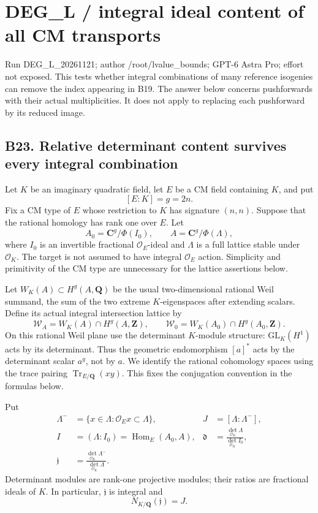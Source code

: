 \documentclass[11pt,a4paper]{article}
\providecommand{\tightlist}{\setlength{\itemsep}{0pt}\setlength{\parskip}{0pt}}
\theoremstyle{definition}
\begin{document}
\providecommand{\tightlist}{\setlength{\itemsep}{0pt}\setlength{\parskip}{0pt}}
\section{DEG\_L / integral ideal content of all CM transports}\label{deg_l-integral-ideal-content-of-all-cm-transports}

Run DEG\_L\_20261121; author /root/lvalue\_bounds; GPT-6 Astra Pro; effort not exposed. This tests whether integral combinations of many reference isogenies can remove the index appearing in B19. The answer below concerns pushforwards with their actual multiplicities. It does not apply to replacing each pushforward by its reduced image.

\subsection{B23. Relative determinant content survives every integral combination}\label{b23.-relative-determinant-content-survives-every-integral-combination}

Let \(K\) be an imaginary quadratic field, let \(E\) be a CM field containing \(K\), and put \[
 [E:K]=g=2n.
\] Fix a CM type of \(E\) whose restriction to \(K\) has signature \((n,n)\). Suppose that the rational homology has rank one over \(E\). Let \[
 A_0=\mathbf C^g/\Phi(I_0),\qquad
 A=\mathbf C^g/\Phi(\Lambda),
\] where \(I_0\) is an invertible fractional \(\mathcal O_E\)-ideal and \(\Lambda\) is a full lattice stable under \(\mathcal O_K\). The target is not assumed to have integral \(\mathcal O_E\) action. Simplicity and primitivity of the CM type are unnecessary for the lattice assertions below.

Let \(W_K(A)\subset H^g(A,\mathbf Q)\) be the usual two-dimensional rational Weil summand, the sum of the two extreme \(K\)-eigenspaces after extending scalars. Define its actual integral intersection lattice by \[
 \mathscr W_A=W_K(A)\cap H^g(A,\mathbf Z),
 \qquad
 \mathscr W_0=W_K(A_0)\cap H^g(A_0,\mathbf Z).
\tag{B23.1}
\] On this rational Weil plane use the determinant \(K\)-module structure: \(\mathrm{GL}_K(H^1)\) acts by its determinant. Thus the geometric endomorphism \([a]^*\) acts by the determinant scalar \(a^g\), not by \(a\). We identify the rational cohomology spaces using the trace pairing \(\operatorname{Tr}_{E/\mathbf Q}(xy)\). This fixes the conjugation convention in the formulas below.

Put \[
 \begin{aligned}
 \Lambda^-&=\{x\in\Lambda:\mathcal O_E x\subset\Lambda\},
 &J&=[\Lambda:\Lambda^-],\\
 I&=(\Lambda:I_0)=\operatorname{Hom}_E(A_0,A),
 &\mathfrak d&=\frac{\det_{\mathcal O_K}\Lambda}
                       {\det_{\mathcal O_K}I_0},\\
 \mathfrak j&=\frac{\det_{\mathcal O_K}\Lambda^-}
                       {\det_{\mathcal O_K}\Lambda}.
 \end{aligned}
\tag{B23.2}
\] Determinant modules are rank-one projective modules; their ratios are fractional ideals of \(K\). In particular, \(\mathfrak j\) is integral and \[
 N_{K/\mathbf Q}(\mathfrak j)=J.
\]
\end{document}
